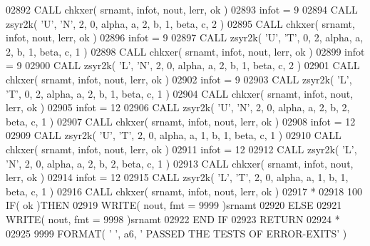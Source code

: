 \begin{DoxyCode}
02892       \textcolor{keyword}{CALL }chkxer( srnamt, infot, nout, lerr, ok )
02893       infot = 9
02894       \textcolor{keyword}{CALL }zsyr2k( \textcolor{stringliteral}{'U'}, \textcolor{stringliteral}{'N'}, 2, 0, alpha, a, 2, b, 1, beta, c, 2 )
02895       \textcolor{keyword}{CALL }chkxer( srnamt, infot, nout, lerr, ok )
02896       infot = 9
02897       \textcolor{keyword}{CALL }zsyr2k( \textcolor{stringliteral}{'U'}, \textcolor{stringliteral}{'T'}, 0, 2, alpha, a, 2, b, 1, beta, c, 1 )
02898       \textcolor{keyword}{CALL }chkxer( srnamt, infot, nout, lerr, ok )
02899       infot = 9
02900       \textcolor{keyword}{CALL }zsyr2k( \textcolor{stringliteral}{'L'}, \textcolor{stringliteral}{'N'}, 2, 0, alpha, a, 2, b, 1, beta, c, 2 )
02901       \textcolor{keyword}{CALL }chkxer( srnamt, infot, nout, lerr, ok )
02902       infot = 9
02903       \textcolor{keyword}{CALL }zsyr2k( \textcolor{stringliteral}{'L'}, \textcolor{stringliteral}{'T'}, 0, 2, alpha, a, 2, b, 1, beta, c, 1 )
02904       \textcolor{keyword}{CALL }chkxer( srnamt, infot, nout, lerr, ok )
02905       infot = 12
02906       \textcolor{keyword}{CALL }zsyr2k( \textcolor{stringliteral}{'U'}, \textcolor{stringliteral}{'N'}, 2, 0, alpha, a, 2, b, 2, beta, c, 1 )
02907       \textcolor{keyword}{CALL }chkxer( srnamt, infot, nout, lerr, ok )
02908       infot = 12
02909       \textcolor{keyword}{CALL }zsyr2k( \textcolor{stringliteral}{'U'}, \textcolor{stringliteral}{'T'}, 2, 0, alpha, a, 1, b, 1, beta, c, 1 )
02910       \textcolor{keyword}{CALL }chkxer( srnamt, infot, nout, lerr, ok )
02911       infot = 12
02912       \textcolor{keyword}{CALL }zsyr2k( \textcolor{stringliteral}{'L'}, \textcolor{stringliteral}{'N'}, 2, 0, alpha, a, 2, b, 2, beta, c, 1 )
02913       \textcolor{keyword}{CALL }chkxer( srnamt, infot, nout, lerr, ok )
02914       infot = 12
02915       \textcolor{keyword}{CALL }zsyr2k( \textcolor{stringliteral}{'L'}, \textcolor{stringliteral}{'T'}, 2, 0, alpha, a, 1, b, 1, beta, c, 1 )
02916       \textcolor{keyword}{CALL }chkxer( srnamt, infot, nout, lerr, ok )
02917 \textcolor{comment}{*}
02918   100 \textcolor{keywordflow}{IF}( ok )\textcolor{keywordflow}{THEN}
02919          \textcolor{keyword}{WRITE}( nout, fmt = 9999 )srnamt
02920       \textcolor{keywordflow}{ELSE}
02921          \textcolor{keyword}{WRITE}( nout, fmt = 9998 )srnamt
02922 \textcolor{keywordflow}{      END IF}
02923       \textcolor{keywordflow}{RETURN}
02924 \textcolor{comment}{*}
02925  9999 \textcolor{keyword}{FORMAT}( \textcolor{stringliteral}{' '}, a6, \textcolor{stringliteral}{' PASSED THE TESTS OF ERROR-EXITS'} )

\end{DoxyCode}
